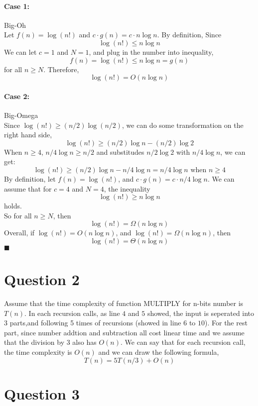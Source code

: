 \documentclass{article}
\begin{document}
    \paragraph{Case 1: } Big-Oh\\
    Let $f(n) = \log(n!)$ and $ c \cdot g(n) = c \cdot n \log n$. By definition, Since
    $$\log(n!) \leq n\log n$$
    We can let $c = 1$ and $N = 1$, and plug in the number into inequality,
    $$f(n) = \log(n!) \leq n\log n = g(n)$$
    for all $n \geq N$. Therefore,
    $$\log(n!) = O(n\log n)$$

    \paragraph{Case 2: } Big-Omega\\
    Since $\log(n!) \geq (n/2)\log(n/2)$, we can do some transformation on the right hand side,
    $$\log(n!) \geq (n/2)\log n - (n/2)\log 2$$
    When $n \geq 4$, $n/4 \log n \geq n/2$ and substitudes $n/2 \log 2$ with
    $n/4 \log n$, we can get:
    $$\log(n!) \geq (n/2)\log n - n/4\log n = n/4\log n \mbox{ when } n \geq 4$$
    By definition, let $f(n) = \log(n!)$, and $c \cdot g(n) = c \cdot n/4 \log n $.
    We can assume that for $c = 4$ and $N = 4$, the inequality 
    $$\log(n!) \geq n\log n$$
    holds.\\
    So for all $n \geq N$, then 
    $$\log(n!) = \Omega(n\log n)$$
    Overall, if $\log(n!) = O(n\log n)$, and $\log(n!) = \Omega(n\log n)$, then
    $$\log(n!) = \Theta(n \log n)$$
    $\blacksquare$








  
\section*{Question 2}
Assume that the time complexity of function MULTIPLY for n-bits number
is $T(n)$. In each recursion calls, as line $4 $ and $ 5$ showed, the 
input is seperated into 3 parts,and following 5 times of recursions
(showed in line $6$ to $10$). For the rest part, since number addtion and subtraction
all cost linear time and we assume that the division by 3 also has $O(n)$. We can say that 
for each recursion call, the time complexity is $O(n)$ and we can draw the following formula,
$$T(n) = 5T(n/3) + O(n)$$




\section*{Question 3}
\end{document}
